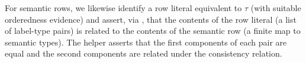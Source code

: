 \documentclass[sigplan,screen]{acmart}
\begin{document}
For semantic rows, we likewise identify a row literal equivalent to $\tau$ (with suitable orderedness evidence) and assert, via , that the contents of the row literal (a list of label-type pairs) is related to the contents of the semantic row (a finite map to semantic types). The helper  asserts that the first components of each pair are equal and the second components are related under the consistency relation.

\begin{AgdaAlign}
\begin{code}%
%
\>[2]\AgdaSpace{}%
\AgdaSymbol{\{}\AgdaSpace{}%
\AgdaSymbol{=}\AgdaSpace{}%
\AgdaOperator{\AgdaInductiveConstructor{R[}}\AgdaSpace{}%
\AgdaSpace{}%
\AgdaOperator{\AgdaInductiveConstructor{]}}\AgdaSymbol{\}}\AgdaSpace{}%
\AgdaSpace{}%
\AgdaSymbol{(}\AgdaSpace{}%
\AgdaSpace{}%
\AgdaSymbol{)}\AgdaSpace{}%
\AgdaSymbol{=}\<%
\\
\>[2][@{}l@{\AgdaIndent{0}}]%
\>[4]\AgdaSpace{}%
\AgdaSpace{}%
\AgdaSymbol{=}\AgdaSpace{}%
\AgdaSpace{}%
\AgdaSymbol{(}\AgdaSpace{}%
\AgdaSymbol{)}\AgdaSpace{}%
\<%
\\
%
\>[4]\AgdaSymbol{(}\AgdaSpace{}%
\AgdaSpace{}%
\AgdaSpace{}%
\AgdaSpace{}%
\AgdaSpace{}%
\AgdaSymbol{(}\AgdaSpace{}%
\AgdaSymbol{(}\AgdaSpace{}%
\AgdaSymbol{(}\AgdaSpace{}%
\AgdaSymbol{))))}\<%
\\
%
\>[4]\AgdaSpace{}%
\AgdaSpace{}%
\AgdaSpace{}%
\AgdaSpace{}%
\<%
\\
%
\>[4]\<%
\\
\>[4][@{}l@{\AgdaIndent{0}}]%
\>[6]\AgdaSpace{}%
\AgdaSymbol{:}%
\>[3573I]\AgdaSpace{}%
\AgdaSymbol{(}\AgdaSpace{}%
\AgdaSpace{}%

\end{code}
\end{AgdaAlign}
\end{document}
